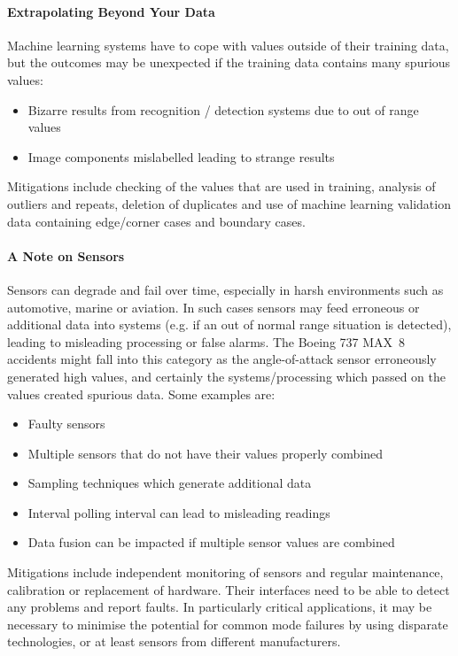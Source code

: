 \paragraph{Extrapolating Beyond Your Data}
Machine learning systems have to cope with values outside of their training data, but the outcomes may be unexpected if the training data contains many spurious values:
\begin{itemize}
    \item Bizarre results from recognition / detection systems due to out of range values
    \item Image components mislabelled leading to strange results
\end{itemize}

Mitigations include checking of the values that are used in training, analysis of outliers and repeats, deletion of duplicates and use of machine learning validation data containing edge/corner cases and boundary cases.

\paragraph{A Note on Sensors}
Sensors can degrade and fail over time, especially in harsh environments such as automotive, marine or aviation. In such cases sensors may feed erroneous or additional data into systems (e.g. if an out of normal range situation is detected), leading to misleading processing or false alarms. The Boeing 737 MAX~8 accidents might fall into this category as the angle-of-attack sensor erroneously generated high values, and certainly the systems/processing which passed on the values created spurious data. Some examples are:
\begin{itemize}
    \item Faulty sensors
    \item Multiple sensors that do not have their values properly combined
    \item Sampling techniques which generate additional data
    \item Interval polling interval can lead to misleading readings
    \item Data fusion can be impacted if multiple sensor values are combined
\end{itemize}

Mitigations include independent monitoring of sensors and regular maintenance, calibration or replacement of hardware. Their interfaces need to be able to detect any problems and report faults. In particularly critical applications, it may be necessary to minimise the potential for common mode failures by using disparate technologies, or at least sensors from different manufacturers.

